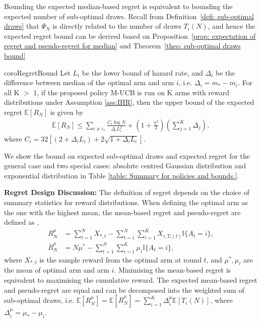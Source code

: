 Bounding the expected median-based regret is equivalent to
bounding the expected number of sub-optimal draws.
Recall from Definition~\ref{defi: sub-optimal draws} that $\Psi_N$ is
directly related to the number of draws $T_i(N)$, and hence
the expected regret bound can be derived based on
Proposition~\ref{prop: expectation of regret and pseudo-regret for median} and
Theorem~\ref{theo: sub-optimal draws bound}

\begin{restatable}{coro}{RegretBound}
\label{theo: regret bound}
Let $L_i$ be the lower bound of hazard rate, and $\Delta_i$ be the difference between median of the optimal arm and arm $i$, i.e. $\Delta_{i} = m_\ast - m_i$.
For all K $>$ 1, if the proposed policy M-UCB is run on K arms with reward distributions under Assumption \ref{ass:IHR},
then the upper bound of the expected regret $\mathbb{E}[R_N]$ is given by
\begin{align}
    \label{equ: regret bound}
    \mathbb{E}[R_N] \leq \sum_{i \neq i_\ast}\frac{C_{i} \log N}{\Delta_i L_{i}^2}  + \left(1 + \frac{\pi^2}{3}\right) \left(\sum_{j=1}^K \Delta_{j}\right) ,
\end{align}
where $C_{i} = 32 \left[(2 + \Delta_i L_{i}) + 2\sqrt{1 + \Delta_i L_{i}}\right]$.
\end{restatable}

We show the bound on expected sub-optimal draws and expected regret for the general case and two special cases: absolute centred Gaussian distribution and exponential distribution in Table \ref{table: Summary for policies and bounds.}. 

\textbf{Regret Design Discussion:} The definition of regret depends on the choice of summary statistics for reward distributions.
When defining the optimal arm as the one with the highest mean, the mean-based regret and pseudo-regret are defined as \cite{Auer2002},
\begin{align}
    \label{equ: mean based regret}
    R^\mu_{N} &= \sum_{t=1}^{N} X_{\ast, t}-\sum_{t=1}^{N} \sum_{i = 1}^{K} X_{i, T_i(t)} \mathbb{I}\{A_t = i\},\\
    \label{equ: mean based pseudo regret}
    \overline{R}^\mu_{N} &=
    N \mu^{*}-\sum_{t=1}^{N} \sum_{i = 1}^{K} \mu_i \mathbb{I}\{A_t = i\},
\end{align}
where $X_{\ast, t}$ is the sample reward from the optimal arm at round $t$, and $\mu^\ast, \mu_i$ are the mean of optimal arm and arm $i$.
Minimising the mean-based regret is equivalent to maximising the cumulative reward.
The expected mean-based regret and pseudo-regret are equal and can be decomposed into the weighted sum of sub-optimal draws, i.e.  $\mathbb{E}[R^\mu_N] = \mathbb{E}[\overline{R}^\mu_{N}] = \sum_{i=1}^K \Delta^\mu_i \mathbb{E}[T_i(N)]$, where $\Delta^\mu_i = \mu_\ast - \mu_i$.


